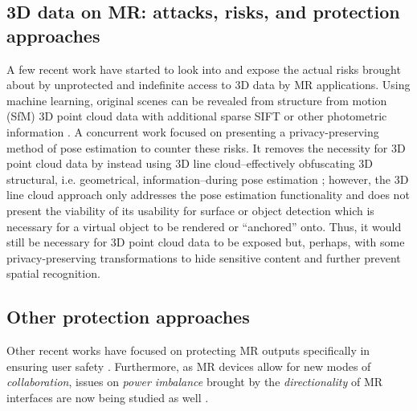 \subsection{3D data on MR: attacks, risks, and protection approaches}\label{rrw:3d}
A few recent work have started to look into and expose the actual risks brought about by unprotected and indefinite access to 3D data by MR applications. Using machine learning, original scenes can be revealed from structure from motion (SfM) 3D point cloud data with additional sparse SIFT or other photometric information \cite{pittaluga2019revealing}. A concurrent work focused on presenting a privacy-preserving method of pose estimation to counter these risks. It removes the necessity for 3D point cloud data by instead using 3D line cloud--effectively obfuscating 3D structural, i.e. geometrical, information--during pose estimation \cite{speciale2019privacy}; however, the 3D line cloud approach only addresses the pose estimation functionality and does not present the viability of its usability for surface or object detection which is necessary for a virtual object to be rendered or ``anchored'' onto. Thus, it would still be necessary for 3D point cloud data to be exposed but, perhaps, with some privacy-preserving transformations to hide sensitive content and further prevent spatial recognition. %

\subsection{Other protection approaches}\label{rrw:others}
Other recent works have focused on protecting MR outputs specifically in ensuring user safety \cite{lebeck2016safely, lebeck2017securing}. Furthermore, as MR devices allow for new modes of \textit{collaboration}, issues on \textit{power imbalance} brought by the \textit{directionality} of MR interfaces \cite{benford1996shared, benford1998boundaries} are now being studied as well \cite{lebeck2018towards}. %


